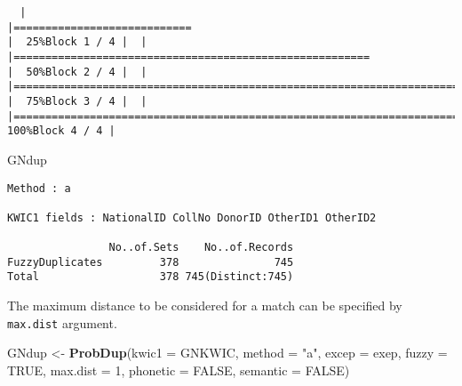 \documentclass[
]{article}
\newenvironment{Shaded}{\begin{snugshade}}{\end{snugshade}}
\newcommand{\DataTypeTok}[1]{\textcolor[rgb]{0.13,0.29,0.53}{#1}}
\newcommand{\DecValTok}[1]{\textcolor[rgb]{0.00,0.00,0.81}{#1}}
\newcommand{\KeywordTok}[1]{\textcolor[rgb]{0.13,0.29,0.53}{\textbf{#1}}}
\newcommand{\NormalTok}[1]{#1}
\newcommand{\OtherTok}[1]{\textcolor[rgb]{0.56,0.35,0.01}{#1}}
\newcommand{\StringTok}[1]{\textcolor[rgb]{0.31,0.60,0.02}{#1}}
\begin{document}
\begin{verbatim}
  |                                                                                                                       |============================                                                                                   |  25%Block 1 / 4 |  |                                                                                                                       |========================================================                                                       |  50%Block 2 / 4 |  |                                                                                                                       |===================================================================================                            |  75%Block 3 / 4 |  |                                                                                                                       |===============================================================================================================| 100%Block 4 / 4 |
\end{verbatim}

\begin{Shaded}
\begin{Highlighting}[]
\NormalTok{GNdup}
\end{Highlighting}
\end{Shaded}

\begin{verbatim}
Method : a

KWIC1 fields : NationalID CollNo DonorID OtherID1 OtherID2
 
                No..of.Sets    No..of.Records
FuzzyDuplicates         378               745
Total                   378 745(Distinct:745)
\end{verbatim}

The maximum distance to be considered for a match can be specified by
\texttt{max.dist} argument.

\begin{Shaded}
\begin{Highlighting}[]
\NormalTok{GNdup <-}\StringTok{ }\KeywordTok{ProbDup}\NormalTok{(}\DataTypeTok{kwic1 =}\NormalTok{ GNKWIC, }\DataTypeTok{method =} \StringTok{"a"}\NormalTok{, }\DataTypeTok{excep =}\NormalTok{ exep, }
                 \DataTypeTok{fuzzy =} \OtherTok{TRUE}\NormalTok{, }\DataTypeTok{max.dist =} \DecValTok{1}\NormalTok{,}
                 \DataTypeTok{phonetic =} \OtherTok{FALSE}\NormalTok{, }\DataTypeTok{semantic =} \OtherTok{FALSE}\NormalTok{)}
\end{Highlighting}
\end{Shaded}
\end{document}
